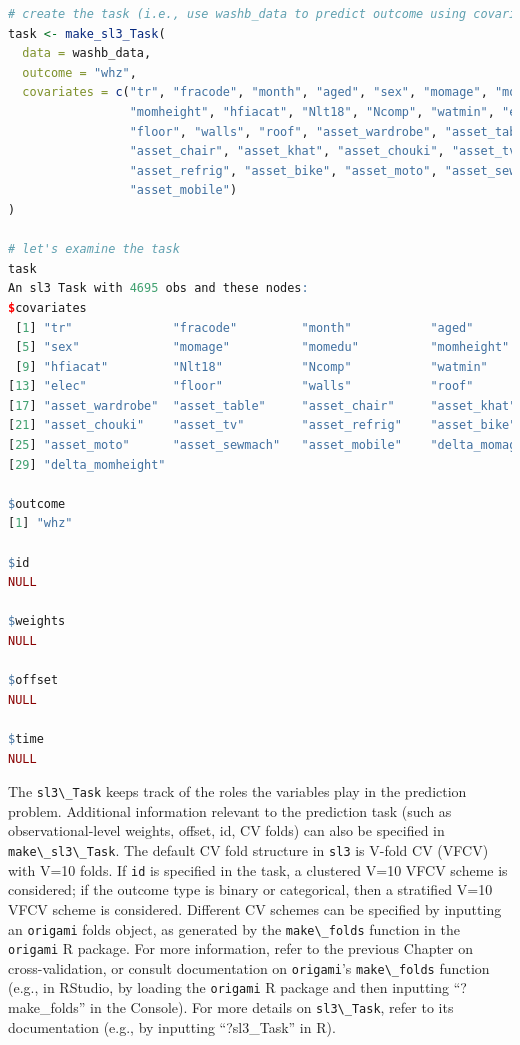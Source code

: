 \documentclass[
  12pt, krantz2,
]{krantz}
\newcommand{\passthrough}[1]{#1}
\newcommand{\1}{\mathbbm{1}}
\theoremstyle{definition}
\theoremstyle{definition}
\theoremstyle{definition}
\theoremstyle{definition}
\theoremstyle{remark}
\begin{document}
\begin{lstlisting}[language=R]
# create the task (i.e., use washb_data to predict outcome using covariates)
task <- make_sl3_Task(
  data = washb_data,
  outcome = "whz",
  covariates = c("tr", "fracode", "month", "aged", "sex", "momage", "momedu", 
                 "momheight", "hfiacat", "Nlt18", "Ncomp", "watmin", "elec", 
                 "floor", "walls", "roof", "asset_wardrobe", "asset_table", 
                 "asset_chair", "asset_khat", "asset_chouki", "asset_tv", 
                 "asset_refrig", "asset_bike", "asset_moto", "asset_sewmach", 
                 "asset_mobile")
)

# let's examine the task
task
An sl3 Task with 4695 obs and these nodes:
$covariates
 [1] "tr"              "fracode"         "month"           "aged"           
 [5] "sex"             "momage"          "momedu"          "momheight"      
 [9] "hfiacat"         "Nlt18"           "Ncomp"           "watmin"         
[13] "elec"            "floor"           "walls"           "roof"           
[17] "asset_wardrobe"  "asset_table"     "asset_chair"     "asset_khat"     
[21] "asset_chouki"    "asset_tv"        "asset_refrig"    "asset_bike"     
[25] "asset_moto"      "asset_sewmach"   "asset_mobile"    "delta_momage"   
[29] "delta_momheight"

$outcome
[1] "whz"

$id
NULL

$weights
NULL

$offset
NULL

$time
NULL
\end{lstlisting}

The \passthrough{\lstinline!sl3\_Task!} keeps track of the roles the variables play in the prediction
problem. Additional information relevant to the prediction task (such as
observational-level weights, offset, id, CV folds) can also be specified in
\passthrough{\lstinline!make\_sl3\_Task!}. The default CV fold structure in \passthrough{\lstinline!sl3!} is V-fold CV (VFCV)
with V=10 folds. If \passthrough{\lstinline!id!} is specified in the task, a clustered V=10 VFCV
scheme is considered; if the outcome type is binary or categorical, then
a stratified V=10 VFCV scheme is considered. Different CV schemes can be
specified by inputting an \passthrough{\lstinline!origami!} folds object, as generated by the
\passthrough{\lstinline!make\_folds!} function in the \passthrough{\lstinline!origami!} R package. For more information,
refer to the previous Chapter on cross-validation, or consult documentation
on \passthrough{\lstinline!origami!}'s \passthrough{\lstinline!make\_folds!} function (e.g., in RStudio, by
loading the \passthrough{\lstinline!origami!} R package and then inputting ``?make\_folds'' in the
Console). For more details on \passthrough{\lstinline!sl3\_Task!}, refer to its documentation (e.g., by
inputting ``?sl3\_Task'' in R).
\end{document}
